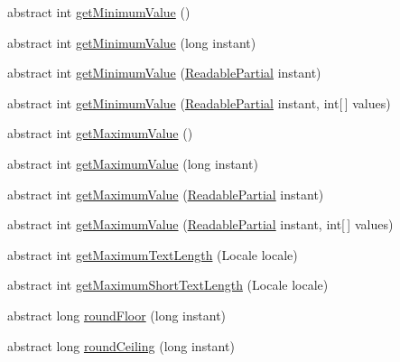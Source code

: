 \begin{DoxyCompactItemize}
abstract int \hyperlink{classorg_1_1joda_1_1time_1_1_date_time_field_a95b2fd77f46eb1be80d205f9f3347668}{get\-Minimum\-Value} ()
\item 
abstract int \hyperlink{classorg_1_1joda_1_1time_1_1_date_time_field_a5f4d1559bb26dfff9933fa95f1479d46}{get\-Minimum\-Value} (long instant)
\item 
abstract int \hyperlink{classorg_1_1joda_1_1time_1_1_date_time_field_ab6ba23ea43595343521a154212f177ea}{get\-Minimum\-Value} (\hyperlink{interfaceorg_1_1joda_1_1time_1_1_readable_partial}{Readable\-Partial} instant)
\item 
abstract int \hyperlink{classorg_1_1joda_1_1time_1_1_date_time_field_a7c06f28e05eff45e241d5dd1856a2130}{get\-Minimum\-Value} (\hyperlink{interfaceorg_1_1joda_1_1time_1_1_readable_partial}{Readable\-Partial} instant, int\mbox{[}$\,$\mbox{]} values)
\item 
abstract int \hyperlink{classorg_1_1joda_1_1time_1_1_date_time_field_a287a52fa69225e1ec60570ae5c9c4a52}{get\-Maximum\-Value} ()
\item 
abstract int \hyperlink{classorg_1_1joda_1_1time_1_1_date_time_field_a6057057b78ead0d5cbb2570f265ae57d}{get\-Maximum\-Value} (long instant)
\item 
abstract int \hyperlink{classorg_1_1joda_1_1time_1_1_date_time_field_a167a9bddcae920462d20d4ed1ef35407}{get\-Maximum\-Value} (\hyperlink{interfaceorg_1_1joda_1_1time_1_1_readable_partial}{Readable\-Partial} instant)
\item 
abstract int \hyperlink{classorg_1_1joda_1_1time_1_1_date_time_field_acd3a93d69aa3e709350ef835b2f8b64f}{get\-Maximum\-Value} (\hyperlink{interfaceorg_1_1joda_1_1time_1_1_readable_partial}{Readable\-Partial} instant, int\mbox{[}$\,$\mbox{]} values)
\item 
abstract int \hyperlink{classorg_1_1joda_1_1time_1_1_date_time_field_a21bf3f0ef56608f6fd2f0c13d7cdc8f5}{get\-Maximum\-Text\-Length} (Locale locale)
\item 
abstract int \hyperlink{classorg_1_1joda_1_1time_1_1_date_time_field_a5bea1816ef82ba96912b02243a3c1c86}{get\-Maximum\-Short\-Text\-Length} (Locale locale)
\item 
abstract long \hyperlink{classorg_1_1joda_1_1time_1_1_date_time_field_a324fc5295f21a7777080a423d256604a}{round\-Floor} (long instant)
\item 
abstract long \hyperlink{classorg_1_1joda_1_1time_1_1_date_time_field_ab82dcd2e5a3b9c7d54f96a1e4dc2f9d7}{round\-Ceiling} (long instant)
\item 

\end{DoxyCompactItemize}
